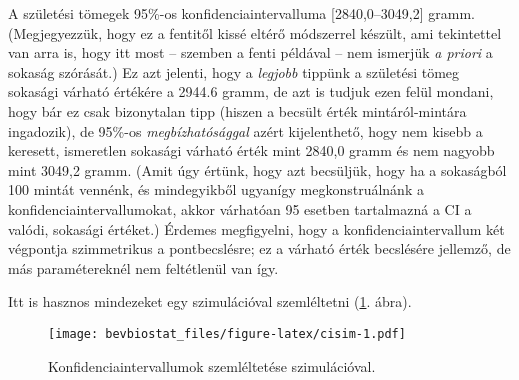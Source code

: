 \documentclass[]{book}
\newenvironment{Shaded}{\begin{snugshade}}{\end{snugshade}}
\newcommand{\DataTypeTok}[1]{\textcolor[rgb]{0.13,0.29,0.53}{#1}}
\newcommand{\DecValTok}[1]{\textcolor[rgb]{0.00,0.00,0.81}{#1}}
\newcommand{\FloatTok}[1]{\textcolor[rgb]{0.00,0.00,0.81}{#1}}
\newcommand{\KeywordTok}[1]{\textcolor[rgb]{0.13,0.29,0.53}{\textbf{#1}}}
\newcommand{\NormalTok}[1]{#1}
\newcommand{\OperatorTok}[1]{\textcolor[rgb]{0.81,0.36,0.00}{\textbf{#1}}}
\newcommand{\OtherTok}[1]{\textcolor[rgb]{0.56,0.35,0.01}{#1}}
\newcommand{\StringTok}[1]{\textcolor[rgb]{0.31,0.60,0.02}{#1}}
\begin{document}
A születési tömegek 95\%-os konfidenciaintervalluma {[}2840,0--3049,2{]} gramm. (Megjegyezzük, hogy ez a fentitől kissé eltérő módszerrel készült, ami tekintettel van arra is, hogy itt most -- szemben a fenti példával -- nem ismerjük \emph{a priori} a sokaság szórását.) Ez azt jelenti, hogy a \emph{legjobb} tippünk a születési tömeg sokasági várható értékére a 2944.6 gramm, de azt is tudjuk ezen felül mondani, hogy bár ez csak bizonytalan tipp (hiszen a becsült érték mintáról-mintára ingadozik), de 95\%-os \emph{megbízhatósággal} azért kijelenthető, hogy nem kisebb a keresett, ismeretlen sokasági várható érték mint 2840,0 gramm és nem nagyobb mint 3049,2 gramm. (Amit úgy értünk, hogy azt becsüljük, hogy ha a sokaságból 100 mintát vennénk, és mindegyikből ugyanígy megkonstruálnánk a konfidenciaintervallumokat, akkor várhatóan 95 esetben tartalmazná a CI a valódi, sokasági értéket.) Érdemes megfigyelni, hogy a konfidenciaintervallum két végpontja szimmetrikus a pontbecslésre; ez a várható érték becslésére jellemző, de más paramétereknél nem feltétlenül van így.

Itt is hasznos mindezeket egy szimulációval szemléltetni (\ref{fig:cisim}. ábra).

\begin{Shaded}
\end{Shaded}

\begin{figure}
\centering
\texttt{[image: bevbiostat\_files/figure-latex/cisim-1.pdf]}
\caption{\label{fig:cisim}Konfidenciaintervallumok szemléltetése szimulációval.}
\end{figure}
\end{document}
